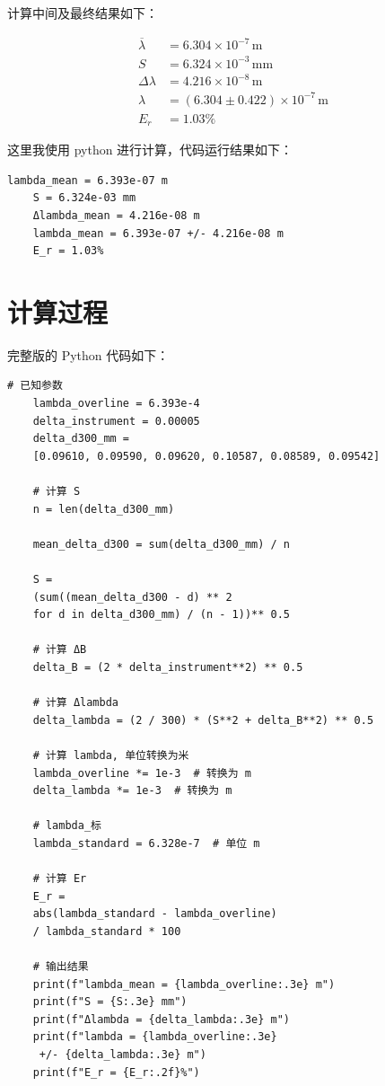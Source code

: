 \documentclass[12pt]{article}
\begin{document}

计算中间及最终结果如下：

\begin{align*}
\overline{\lambda} &= 6.304 \times 10^{-7} \, \text{m} \\
S &= 6.324 \times 10^{-3} \, \text{mm} \\
\Delta \lambda &= 4.216 \times 10^{-8} \, \text{m} \\
\lambda &= (6.304 \pm 0.422) \times 10^{-7} \, \text{m}\\
E_r &= 1.03\%
\end{align*}

这里我使用 python 进行计算，代码运行结果如下：

\begin{Verbatim}[frame=single, fontsize=\small]
    lambda_mean = 6.393e-07 m
    S = 6.324e-03 mm
    Δlambda_mean = 4.216e-08 m
    lambda_mean = 6.393e-07 +/- 4.216e-08 m
    E_r = 1.03%
\end{Verbatim}

\section{\normalfont 计算过程}


完整版的 Python 代码如下：

\begin{Verbatim}[frame=single, fontsize=\small]
    # 已知参数
    lambda_overline = 6.393e-4
    delta_instrument = 0.00005
    delta_d300_mm =
    [0.09610, 0.09590, 0.09620, 0.10587, 0.08589, 0.09542]
    
    # 计算 S
    n = len(delta_d300_mm)

    mean_delta_d300 = sum(delta_d300_mm) / n

    S = 
    (sum((mean_delta_d300 - d) ** 2 
    for d in delta_d300_mm) / (n - 1))** 0.5
    
    # 计算 ΔB
    delta_B = (2 * delta_instrument**2) ** 0.5
    
    # 计算 Δlambda
    delta_lambda = (2 / 300) * (S**2 + delta_B**2) ** 0.5
    
    # 计算 lambda, 单位转换为米
    lambda_overline *= 1e-3  # 转换为 m
    delta_lambda *= 1e-3  # 转换为 m
    
    # lambda_标
    lambda_standard = 6.328e-7  # 单位 m
    
    # 计算 Er
    E_r = 
    abs(lambda_standard - lambda_overline) 
    / lambda_standard * 100
    
    # 输出结果
    print(f"lambda_mean = {lambda_overline:.3e} m")
    print(f"S = {S:.3e} mm")
    print(f"Δlambda = {delta_lambda:.3e} m")
    print(f"lambda = {lambda_overline:.3e}
     +/- {delta_lambda:.3e} m")
    print(f"E_r = {E_r:.2f}%")
    
    
\end{Verbatim}
\end{document}
